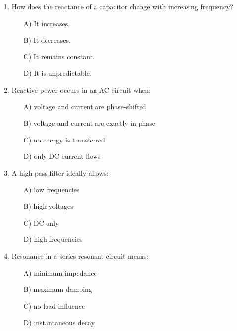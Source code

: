 \documentclass[a4paper,12pt]{article}
\newif\ifshowsolutions
\begin{document}
\begin{enumerate}[label=\textbf{\arabic*.}, leftmargin=*, itemsep=8pt]
\ifshowsolutions
Solution: C
\fi

  \item How does the reactance of a capacitor change with increasing frequency?
    \begin{itemize}[label=$\square$]
      \item[A)] It increases.
      \item[B)] It decreases.
      \item[C)] It remains constant.
      \item[D)] It is unpredictable.
    \end{itemize}

\ifshowsolutions
Solution: B
\fi

  \item Reactive power occurs in an AC circuit when:
    \begin{itemize}[label=$\square$]
      \item[A)] voltage and current are phase-shifted
      \item[B)] voltage and current are exactly in phase
      \item[C)] no energy is transferred
      \item[D)] only DC current flows
    \end{itemize}

\ifshowsolutions
Solution: A
\fi

  \item A high-pass filter ideally allows:
    \begin{itemize}[label=$\square$]
      \item[A)] low frequencies
      \item[B)] high voltages
      \item[C)] DC only
      \item[D)] high frequencies
    \end{itemize}

\ifshowsolutions
Solution: D
\fi

  \item Resonance in a series resonant circuit means:
    \begin{itemize}[label=$\square$]
      \item[A)] minimum impedance
      \item[B)] maximum damping
      \item[C)] no load influence
      \item[D)] instantaneous decay
    \end{itemize}


\end{enumerate}
\end{document}
